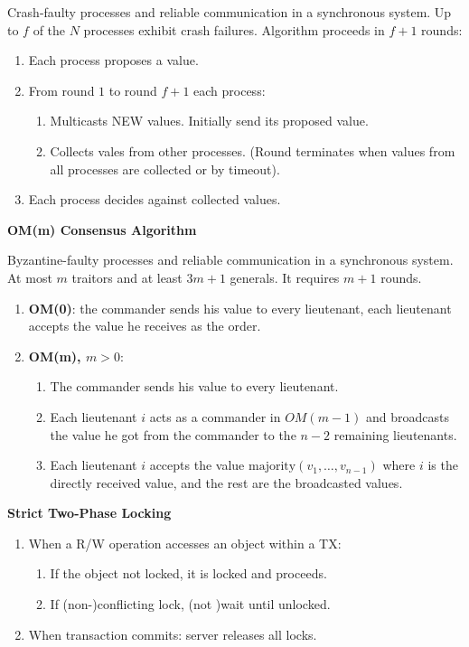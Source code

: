 \documentclass[a4paper, 10pt, twocolumn]{article}
\begin{document}
    Crash-faulty processes and reliable communication in a synchronous system.
    Up to $f$ of the $N$ processes exhibit crash failures.
    Algorithm proceeds in $f+1$ rounds:
    \begin{enumerate}
        \item Each process proposes a value.
        \item From round $1$ to round $f+1$ each process:
        \begin{enumerate}
            \item Multicasts NEW values. Initially send its proposed value.
            \item Collects vales from other processes. (Round terminates when values from all processes are collected or by timeout).
        \end{enumerate}
        \item Each process decides against collected values.
    \end{enumerate}

    \textbf{OM(m) Consensus Algorithm}

    Byzantine-faulty processes and reliable communication in a synchronous system.
    At most $m$ traitors and at least $3m + 1$ generals.
    It requires $m+1$ rounds.
    \begin{enumerate}
        \item \textbf{OM(0)}: the commander sends his value to every lieutenant, each lieutenant accepts the value he receives as the order.
        \item \textbf{OM(m), $m > 0$}:
        \begin{enumerate}
            \item The commander sends his value to every lieutenant.
            \item Each lieutenant $i$ acts as a commander in $OM(m-1)$ and broadcasts the value he got from the commander to the $n-2$ remaining lieutenants.
            \item Each lieutenant $i$ accepts the value $\text{majority}(v_1, \dots, v_{n-1})$ where $i$ is the directly received value, and the rest are the broadcasted values.
        \end{enumerate}
    \end{enumerate}

    \newpage

    \textbf{Strict Two-Phase Locking}
    \begin{enumerate}
        \item When a R/W operation accesses an object within a TX:
        \begin{enumerate}
            \item If the object not locked, it is locked and proceeds.
            \item If (non-)conflicting lock, (not )wait until unlocked.
        \end{enumerate}
        \item When transaction commits: server releases all locks.
    \end{enumerate}
\end{document}
